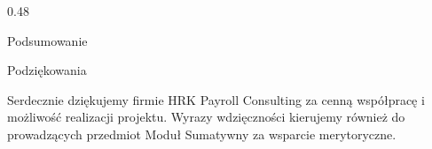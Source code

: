 \documentclass[final]{beamer} %
\begin{document}
\begin{frame}{}
\begin{columns}[T]
\begin{column}[T]{0.48\textwidth}
\begin{block}{Podsumowanie}
\end{block}

\begin{block}{Podziękowania}

Serdecznie dziękujemy firmie HRK Payroll Consulting za cenną współpracę i możliwość realizacji projektu. Wyrazy wdzięczności kierujemy również do prowadzących przedmiot Moduł Sumatywny za wsparcie merytoryczne.

\end{block}

\end{column}
\end{columns}
    \vfill
\end{frame}
\end{document}
